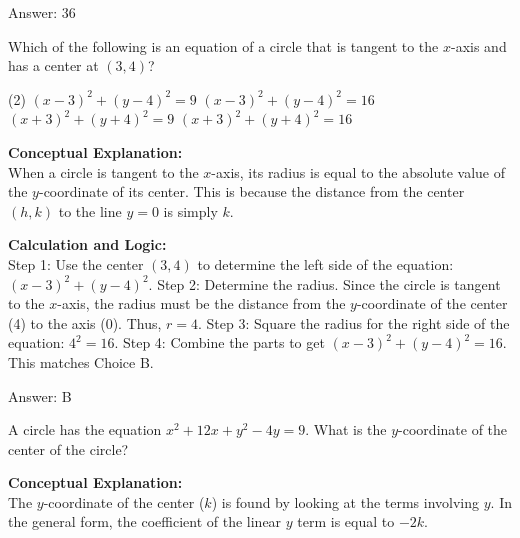 \documentclass[11pt,paper=a4,answers]{exam}
\begin{document}
\begin{questions}
\begin{solution}
\vspace{30pt}

Answer: \colorbox{yellow!100}{36}
\end{solution}

\vspace{60pt}

\question
Which of the following is an equation of a circle that is tangent to the $x$-axis and has a center at $(3, 4)$?
\begin{tasks}(2)
    \task $(x - 3)^2 + (y - 4)^2 = 9$
    \task $(x - 3)^2 + (y - 4)^2 = 16$
    \task $(x + 3)^2 + (y + 4)^2 = 9$
    \task $(x + 3)^2 + (y + 4)^2 = 16$
\end{tasks}

\begin{solution}
\textbf{Conceptual Explanation:} \\
When a circle is tangent to the $x$-axis, its radius is equal to the absolute value of the $y$-coordinate of its center. This is because the distance from the center $(h, k)$ to the line $y=0$ is simply $k$.

\vspace{30pt}

\textbf{Calculation and Logic:} \\
Step 1: Use the center $(3, 4)$ to determine the left side of the equation: $(x - 3)^2 + (y - 4)^2$. Step 2: Determine the radius. Since the circle is tangent to the $x$-axis, the radius must be the distance from the $y$-coordinate of the center (4) to the axis (0). Thus, $r = 4$. Step 3: Square the radius for the right side of the equation: $4^2 = 16$. Step 4: Combine the parts to get $(x - 3)^2 + (y - 4)^2 = 16$. This matches Choice B.

\vspace{30pt}

Answer: \colorbox{yellow!100}{B}
\end{solution}

\vspace{60pt}

\question
A circle has the equation $x^2 + 12x + y^2 - 4y = 9$. What is the $y$-coordinate of the center of the circle?

\begin{solution}
\textbf{Conceptual Explanation:} \\
The $y$-coordinate of the center ($k$) is found by looking at the terms involving $y$. In the general form, the coefficient of the linear $y$ term is equal to $-2k$.


\end{solution}
\end{questions}
\end{document}
